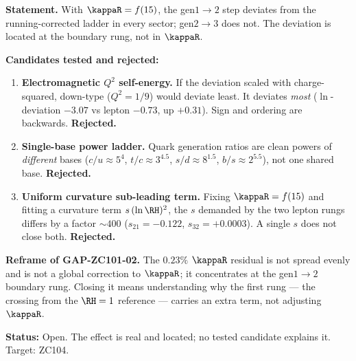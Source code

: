 \documentclass[12pt, a4paper]{article}
\begin{document}
\begin{openqbox}[title={GAP-ZC103-01: The first-rung effect (Priority 1; candidates rejected)}]

\textbf{Statement.} With $\kappaR=f(15)$, the gen$1{\to}2$ step deviates from the
running-corrected ladder in every sector; gen$2{\to}3$ does not. The deviation is
located at the boundary rung, not in $\kappaR$.

\textbf{Candidates tested and rejected:}
\begin{enumerate}[leftmargin=2em, noitemsep]
  \item \textbf{Electromagnetic $Q^2$ self-energy.} If the deviation scaled with
    charge-squared, down-type ($Q^2=1/9$) would deviate least. It deviates
    \emph{most} ($\ln$-deviation $-3.07$ vs lepton $-0.73$, up $+0.31$). Sign and
    ordering are backwards. \textbf{Rejected.}
  \item \textbf{Single-base power ladder.} Quark generation ratios are clean
    powers of \emph{different} bases ($c/u\approx5^{4}$, $t/c\approx3^{4.5}$,
    $s/d\approx8^{1.5}$, $b/s\approx2^{5.5}$), not one shared base.
    \textbf{Rejected.}
  \item \textbf{Uniform curvature sub-leading term.} Fixing $\kappaR=f(15)$ and
    fitting a curvature term $s\,(\ln\RH)^2$, the $s$ demanded by the two lepton
    rungs differs by a factor $\sim\!400$ ($s_{21}=-0.122$, $s_{32}=+0.0003$). A
    single $s$ does not close both. \textbf{Rejected.}
\end{enumerate}

\textbf{Reframe of GAP-ZC101-02.} The $0.23\%$ $\kappaR$ residual is not spread
evenly and is not a global correction to $\kappaR$; it concentrates at the
gen$1{\to}2$ boundary rung. Closing it means understanding why the first rung ---
the crossing from the $\RH=1$ reference --- carries an extra term, not adjusting
$\kappaR$.

\textbf{Status:} Open. The effect is real and located; no tested candidate
explains it. Target: ZC104.
\end{openqbox}
\end{document}
